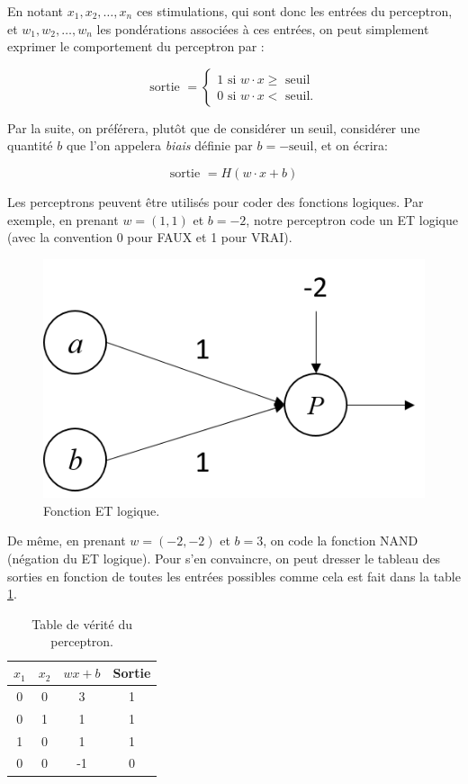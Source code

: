 En notant $x_1, x_2, \dots, x_n$ ces stimulations, qui sont donc les entrées du perceptron, et 
$w_1, w_2, \dots, w_n$ les pondérations associées à ces entrées, on peut simplement exprimer le 
comportement du perceptron par :

\[
\text{sortie } =
\begin{cases}
 1 \text{ si } w \cdot x  \geq \text{ seuil} \\
 0 \text{ si } w \cdot x  < \text{ seuil.} 
 \end{cases}
\]

Par la suite, on préférera, plutôt que de considérer un seuil, considérer 
une quantité $b$ que l'on appelera \textit{biais} définie par $b = -\text{seuil}$, et on écrira:

\[
\text{sortie } = H(w \cdot x + b)
\]

Les perceptrons peuvent être utilisés pour coder des fonctions logiques. 
Par exemple, en prenant $w = (1, 1)$ et $b = -2$, notre perceptron code 
un ET logique (avec la convention 0 pour FAUX et 1 pour VRAI).

\begin{figure}[h]
  \centering
  \includegraphics[scale=0.5]{assets/and-perceptron}
  \caption{Fonction ET logique.}
  \label{fig:and-perceptron}
\end{figure}

De même, en prenant $w = (-2, -2)$ et $b = 3$, on code la fonction NAND 
(négation du ET logique). Pour s'en convaincre, on peut dresser le tableau 
des sorties en fonction de toutes les entrées possibles comme cela est fait 
dans la table \ref{table:nand-perceptron}.

\begin{table}[h]
  \centering
\begin{tabular}{|c|c|c|c|}
\hline
$x_1$ & $x_2$ & $wx + b$ & Sortie \\
\hline
0     & 0     & 3        & 1 \\  
0     & 1     & 1        & 1 \\  
1     & 0     & 1        & 1 \\  
0     & 0     & -1       & 0 \\   
\hline
\end{tabular} 
  \caption{Table de vérité du perceptron.}
  \label{table:nand-perceptron}
\end{table}

